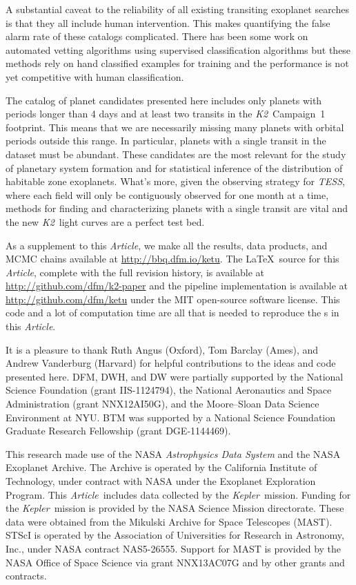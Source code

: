 \documentclass[12pt,preprint]{aastex}
\newcommand{\project}[1]{\textsl{#1}} %
\newcommand{\kepler}{\project{Kepler}}
\newcommand{\KT}{\project{K2}}
\newcommand{\tess}{\project{TESS}}
\newcommand{\paper}{\textsl{Article}}
\newcommand{\datareleaseurl}{{\url{http://bbq.dfm.io/ketu}}}
\begin{document}
A substantial caveat to the reliability of all existing transiting exoplanet
searches is that they all include human intervention.
This makes quantifying the false alarm rate of these catalogs complicated.
There has been some work on automated vetting algorithms using supervised
classification algorithms \citep{vetting, jenkins} but these methods rely on
hand classified examples for training and the performance is not yet
competitive with human classification.

The catalog of planet candidates presented here includes only planets with
periods longer than 4 days and at least two transits in the \KT\ Campaign~1
footprint.
This means that we are necessarily missing many planets with orbital periods
outside  this range.
In particular, planets with a single transit in the dataset must be
abundant.
These candidates are the most relevant for the study of planetary system
formation and for statistical inference of the distribution of habitable zone
exoplanets.
What's more, given the observing strategy for \tess, where each field will
only be contiguously observed for one month at a time, methods for finding and
characterizing planets with a single transit are vital and the new \KT\ light
curves are a perfect test bed.

As a supplement to this \paper, we make all the results, data products, and
MCMC chains available at \datareleaseurl.
The \LaTeX\ source for this \paper, complete with the full revision history,
is available at \url{http://github.com/dfm/k2-paper} and the pipeline
implementation is available at \url{http://github.com/dfm/ketu} under the MIT
open-source software license.
This code and a lot of computation time are all that is needed to reproduce
the \figurename s in this \paper.

\acknowledgments
It is a pleasure to thank
Ruth Angus (Oxford),
Tom Barclay (Ames), and
Andrew Vanderburg (Harvard)
for helpful contributions to the ideas and code presented here.
DFM, DWH, and DW were partially supported by the National Science Foundation
(grant IIS-1124794),
the National Aeronautics and Space Administration
(grant NNX12AI50G), and the Moore--Sloan Data Science Environment at NYU.
BTM was supported by a National Science Foundation Graduate Research
Fellowship (grant DGE‐1144469).

This research made use of the NASA \project{Astrophysics Data System} and the
NASA Exoplanet Archive.
The Archive is operated by the California Institute of Technology, under
contract with NASA under the Exoplanet Exploration Program.
This \paper\ includes data collected by the \kepler\ mission. Funding for the
\kepler\ mission is provided by the NASA Science Mission directorate.
These data were obtained from the Mikulski Archive for Space Telescopes
(MAST).
STScI is operated by the Association of Universities for Research in
Astronomy, Inc., under NASA contract NAS5-26555.
Support for MAST is provided by the NASA Office of Space Science via grant
NNX13AC07G and by other grants and contracts.
\end{document}
